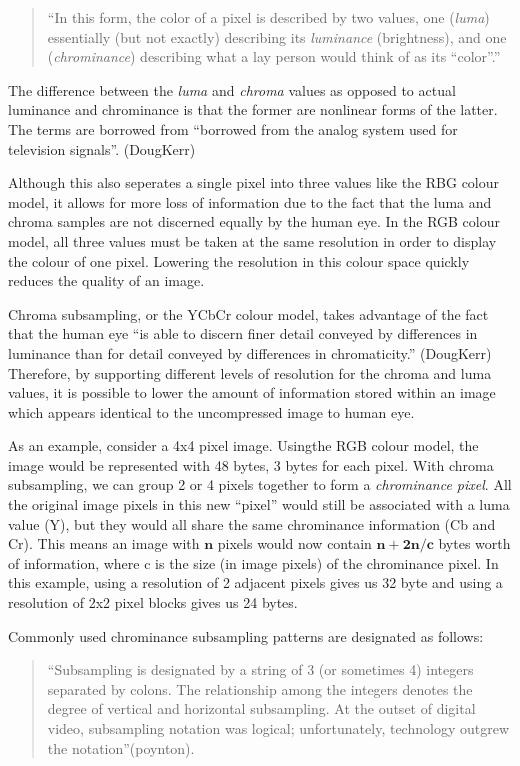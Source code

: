 \begin{quote}
``In this form, the color of a pixel is described by two values, 
one (\emph{luma}) essentially (but not exactly) describing its \emph{luminance} (brightness), and 
one (\emph{chrominance}) describing what a lay person would think of as its ``color''.''
\end{quote}

The difference between the \emph{luma} and \emph{chroma} values as opposed to actual luminance and chrominance is that 
the former are nonlinear forms of the latter. The terms are borrowed from ``borrowed from the analog system used for television signals''. (DougKerr) 

Although this also seperates a single pixel into three values like the RBG colour model, 
it allows for more loss of information due to the fact that the luma and chroma samples are not discerned equally by the human eye. 
In the RGB colour model, all three values must be taken at the same resolution in order to display the colour of one pixel. 
Lowering the resolution in this colour space quickly reduces the quality of an image. 

Chroma subsampling, or the YCbCr colour model, takes advantage of the fact that the human eye 
``is able to discern finer detail conveyed by differences in luminance than for detail conveyed by differences in chromaticity.'' (DougKerr) 
Therefore, by supporting different levels of resolution for the chroma and luma values, 
it is possible to lower the amount of information stored within an image which appears identical to the uncompressed image to human eye.

As an example, consider a 4x4 pixel image. Usingthe RGB colour model, the image would be represented with 48 bytes, 3 bytes for each pixel. 
With chroma subsampling, we can group 2 or 4 pixels together to form a \emph{chrominance pixel}. 
All the original image pixels in this new ``pixel'' would still be associated with a luma value (Y), but 
they would all share the same chrominance information (Cb and Cr). 
This means an image with $\mathbf{n}$ pixels would now contain $\mathbf{n+2n/c}$ bytes worth of information, where 
c is the size (in image pixels) of the chrominance pixel. 
In this example, using a resolution of 2 adjacent pixels gives us 32 byte and using a resolution of 2x2 pixel blocks gives us 24 bytes.

Commonly used chrominance subsampling patterns are designated as follows:

\begin{quote}
``Subsampling is designated by a string of 3 (or sometimes 4) integers separated by colons. 
The relationship among the integers denotes the degree of vertical and horizontal subsampling. 
At the outset of digital video, subsampling notation was logical; unfortunately, technology outgrew the notation''(poynton). 
\end{quote}

